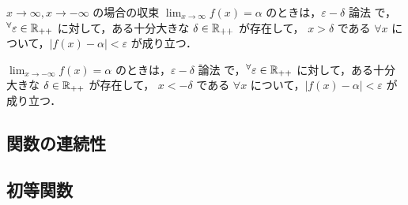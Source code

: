 \documentclass[a4paper]{ltjsarticle}
\begin{document}
  \begin{tcb}{$x \to \infty, x\to -\infty$ の場合の収束}{}
  $\lim_{x \to \infty} f(x) = \alpha$ のときは，$\varepsilon - \delta$ 論法 で，$\forall \varepsilon \in \R_{++}$ に対して，ある十分大きな $\delta \in \mathbb{R}_{++}$ が存在して，
  $x > \delta$ である $\forall x$ について，$|f(x) - \alpha| < \varepsilon$ が成り立つ．

  $\lim_{x \to -\infty} f(x) = \alpha$ のときは，$\varepsilon - \delta$ 論法 で，$\forall \varepsilon \in \R_{++}$ に対して，ある十分大きな $\delta \in \mathbb{R}_{++}$ が存在して，
  $x < -\delta$ である $\forall x$ について，$|f(x) - \alpha| < \varepsilon$ が成り立つ．
  \end{tcb}

  \subsection{関数の連続性}
  \subsection{初等関数}
\end{document}
